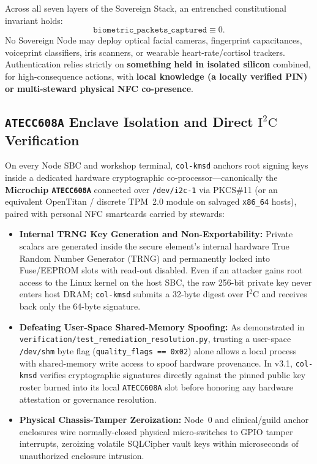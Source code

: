 Across all seven layers of the Sovereign Stack, an entrenched constitutional invariant holds:
\[
\mathtt{biometric\_packets\_captured} \equiv 0.
\]
No Sovereign Node may deploy optical facial cameras, fingerprint capacitances, voiceprint
classifiers, iris scanners, or wearable heart-rate/cortisol trackers. Authentication relies
strictly on \textbf{something held in isolated silicon} combined, for high-consequence actions, with
\textbf{local knowledge (a locally verified PIN) or multi-steward physical NFC co-presence}.

\subsection{\texttt{ATECC608A} Enclave Isolation and Direct $\mathrm{I^2C}$ Verification}

On every Node SBC and workshop terminal, \texttt{col-kmsd} anchors root signing keys inside a
dedicated hardware cryptographic co-processor---canonically the \textbf{Microchip \texttt{ATECC608A}}
connected over \texttt{/dev/i2c-1} via PKCS\#11 \parencite{microchip_atecc608a} (or an
equivalent OpenTitan / discrete TPM~2.0 module on salvaged \texttt{x86\_64} hosts), paired with
personal NFC smartcards carried by stewards:
\begin{itemize}
\item \textbf{Internal TRNG Key Generation and Non-Exportability:} Private scalars are generated
        inside the secure element's internal hardware True Random Number Generator (TRNG) and
        permanently locked into Fuse/EEPROM slots with read-out disabled. Even if an attacker
        gains root access to the Linux kernel on the host SBC, the raw 256-bit private key never
        enters host DRAM; \texttt{col-kmsd} submits a 32-byte digest over $\mathrm{I^2C}$ and
        receives back only the 64-byte signature.
\item \textbf{Defeating User-Space Shared-Memory Spoofing:} As demonstrated in
        \texttt{verification/test\_remediation\_resolution.py}, trusting a user-space
        \texttt{/dev/shm} byte flag (\texttt{quality\_flags == 0x02}) alone allows a local
        process with shared-memory write access to spoof hardware provenance. In v3.1,
        \texttt{col-kmsd} verifies cryptographic signatures directly against the pinned public
        key roster burned into its local \texttt{ATECC608A} slot before honoring any hardware
        attestation or governance resolution.
\item \textbf{Physical Chassis-Tamper Zeroization:} Node~0 and clinical/guild anchor enclosures
        wire normally-closed physical micro-switches to GPIO tamper interrupts, zeroizing
        volatile SQLCipher vault keys within microseconds of unauthorized enclosure intrusion.
\end{itemize}

